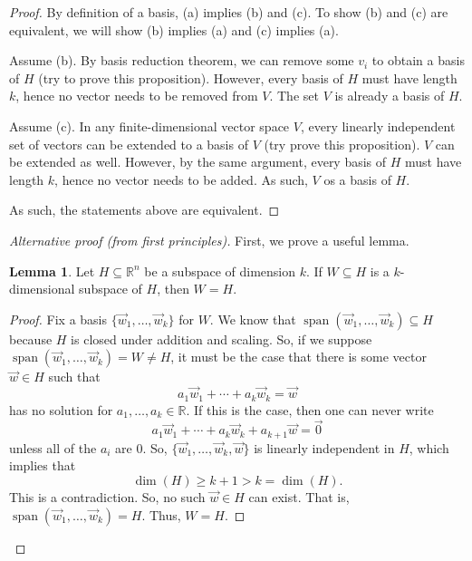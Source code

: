 \documentclass{amsart}
\theoremstyle{definition}
\newtheorem{lemma}[definition]{Lemma}
\theoremstyle{definition}
\DeclareMathOperator{\1}{\mathbbm{1}}
\DeclareMathOperator{\Span}{span}
\begin{document}
\begin{enumerate}[itemsep = 2mm]
		\begin{proof}
			By definition of a basis, (a) implies (b) and (c). To show (b) and (c) are equivalent, we will show (b) implies (a) and (c) implies (a).
			
			Assume (b). By basis reduction theorem, we can remove some $v_i$ to obtain a basis of $H$ (try to prove this proposition). However, every basis of $H$ must have length $k$, hence no vector needs to be removed from $V$. The set $V$ is already a basis of $H$.
			
			Assume (c). In any finite-dimensional vector space $V$, every linearly independent set of vectors can be extended to a basis of $V$ (try prove this proposition). $V$ can be extended as well. However, by the same argument, every basis of $H$ must have length $k$, hence no vector needs to be added. As such, $V$ os a basis of $H$.
			
			As such, the statements above are equivalent.
		\end{proof}
	
	
		\begin{proof}[Alternative proof (from first principles)]
		First, we prove a useful lemma.
		\begin{lemma}
			\label{lem1}
			Let $H\subseteq \mathbb{R}^n$ be a subspace of dimension $k$. If $W\subseteq H$ is a $k$-dimensional subspace of $H$, then $W=H$.
		\end{lemma}
		
		\begin{proof}
		Fix a basis $\{\vec{w}_1,\ldots,\vec{w}_k\}$ for $W$. We know that $\Span(\vec{w}_1,\ldots, \vec{w}_k)\subseteq H$ because $H$ is closed under addition and scaling. So, if we suppose $\Span(\vec{w}_1,\ldots, \vec{w}_k)=W\ne H$, it must be the case that there is some vector $\vec{w}\in H$ such that 
		\begin{equation*}
		a_1\vec{w}_1+\cdots +a_k\vec{w}_k=\vec{w}
		\end{equation*} 
		has no solution for $a_1,\ldots, a_k\in \mathbb{R}$. If this is the case, then one can never write 
		\begin{equation*}
		a_1\vec{w}_1+\cdots+a_k\vec{w}_k+a_{k+1}\vec{w}= \vec{0}
		\end{equation*}
		unless all of the $a_i$ are $0$. So, $\{\vec{w}_1,\ldots, \vec{w}_k, \vec{w}\}$ is linearly independent in $H$, which implies that 
		\begin{equation*}
		\dim(H)\ge k+1>k=\dim(H).
		\end{equation*}
		This is a contradiction. So, no such $\vec{w}\in H$ can exist. That is, $\Span(\vec{w}_1,\ldots, \vec{w}_k)=H$. Thus, $W=H$.
		\end{proof}
		

\end{proof}
\end{enumerate}
\end{document}
